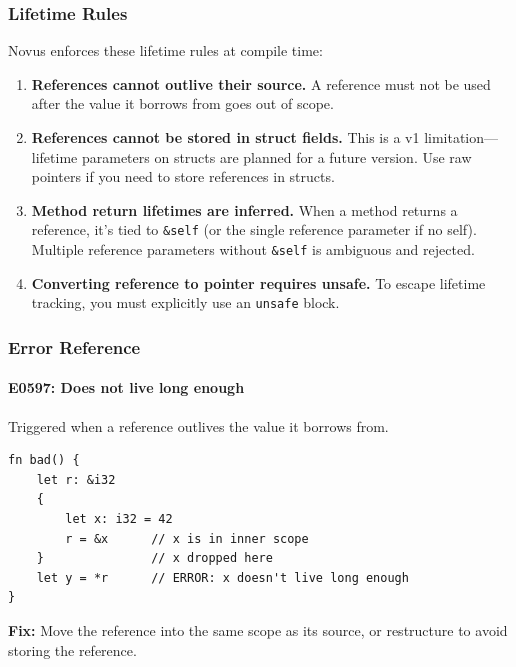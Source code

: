 \subsubsection{Lifetime Rules}

Novus enforces these lifetime rules at compile time:

\begin{enumerate}
    \item \textbf{References cannot outlive their source.} A reference must not be used after the value it borrows from goes out of scope.

    \item \textbf{References cannot be stored in struct fields.} This is a v1 limitation---lifetime parameters on structs are planned for a future version. Use raw pointers if you need to store references in structs.

    \item \textbf{Method return lifetimes are inferred.} When a method returns a reference, it's tied to \texttt{\&self} (or the single reference parameter if no self). Multiple reference parameters without \texttt{\&self} is ambiguous and rejected.

    \item \textbf{Converting reference to pointer requires unsafe.} To escape lifetime tracking, you must explicitly use an \texttt{unsafe} block.
\end{enumerate}

\subsubsection{Error Reference}

\paragraph{E0597: Does not live long enough}

Triggered when a reference outlives the value it borrows from.

\begin{lstlisting}
fn bad() {
    let r: &i32
    {
        let x: i32 = 42
        r = &x      // x is in inner scope
    }               // x dropped here
    let y = *r      // ERROR: x doesn't live long enough
}
\end{lstlisting}

\textbf{Fix:} Move the reference into the same scope as its source, or restructure to avoid storing the reference.

